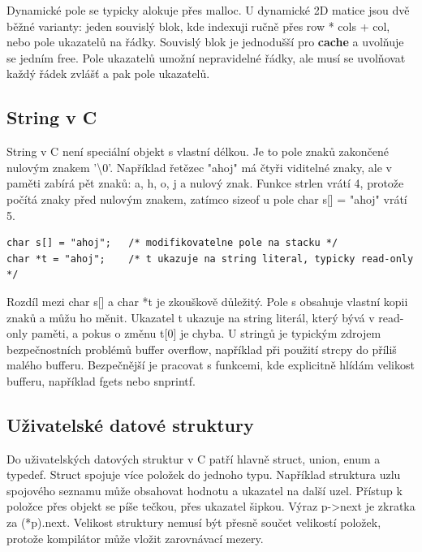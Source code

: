 \documentclass[11pt,a4paper]{article}
\begin{document}
Dynamické pole se typicky alokuje přes malloc. U dynamické 2D matice jsou dvě běžné varianty: jeden souvislý blok, kde indexuji ručně přes row * cols + col, nebo pole ukazatelů na řádky. Souvislý blok je jednodušší pro \textbf{cache} a uvolňuje se jedním free. Pole ukazatelů umožní nepravidelné řádky, ale musí se uvolňovat každý řádek zvlášť a pak pole ukazatelů.

\subsection*{String v C}

String v C není speciální objekt s vlastní délkou. Je to pole znaků zakončené nulovým znakem '\textbackslash{}0'. Například řetězec "ahoj" má čtyři viditelné znaky, ale v paměti zabírá pět znaků: a, h, o, j a nulový znak. Funkce strlen vrátí 4, protože počítá znaky před nulovým znakem, zatímco sizeof u pole char s[] = "ahoj" vrátí 5.

\begin{codebox}
\small
\begin{verbatim}
char s[] = "ahoj";   /* modifikovatelne pole na stacku */
char *t = "ahoj";    /* t ukazuje na string literal, typicky read-only */
\end{verbatim}
\end{codebox}

Rozdíl mezi char s[] a char *t je zkouškově důležitý. Pole s obsahuje vlastní kopii znaků a můžu ho měnit. Ukazatel t ukazuje na string literál, který bývá v read-only paměti, a pokus o změnu t[0] je chyba. U stringů je typickým zdrojem bezpečnostních problémů buffer overflow, například při použití strcpy do příliš malého bufferu. Bezpečnější je pracovat s funkcemi, kde explicitně hlídám velikost bufferu, například fgets nebo snprintf.

\subsection*{Uživatelské datové struktury}

Do uživatelských datových struktur v C patří hlavně struct, union, enum a typedef. Struct spojuje více položek do jednoho typu. Například struktura uzlu spojového seznamu může obsahovat hodnotu a ukazatel na další uzel. Přístup k položce přes objekt se píše tečkou, přes ukazatel šipkou. Výraz p->next je zkratka za (*p).next. Velikost struktury nemusí být přesně součet velikostí položek, protože kompilátor může vložit zarovnávací mezery.
\end{document}
